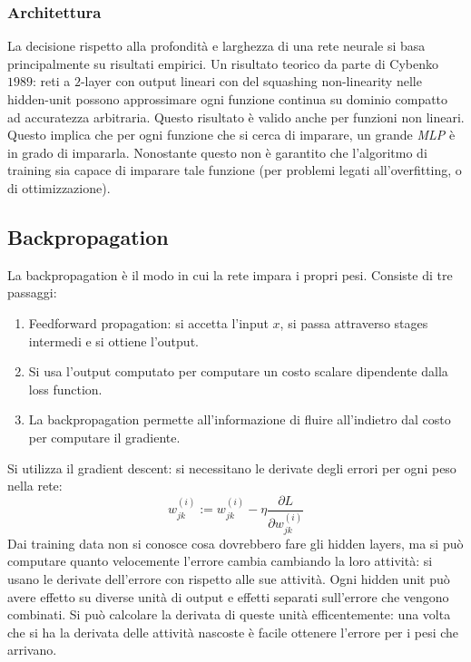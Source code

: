 		\subsubsection{Architettura}
		La decisione rispetto alla profondit\`a e larghezza di una rete neurale si basa principalmente su risultati empirici.
		Un risultato teorico da parte di Cybenko $1989$: reti a $2$-layer con output lineari con del squashing non-linearity nelle hidden-unit possono approssimare ogni funzione continua su dominio compatto ad accuratezza arbitraria.
		Questo risultato \`e valido anche per funzioni non lineari.
		Questo implica che per ogni funzione che si cerca di imparare, un grande \emph{MLP} \`e in grado di impararla.
		Nonostante questo non \`e garantito che l'algoritmo di training sia capace di imparare tale funzione (per problemi legati all'overfitting, o di ottimizzazione).

	\subsection{Backpropagation}
	La backpropagation \`e il modo in cui la rete impara i propri pesi.
	Consiste di tre passaggi:
	\begin{multicols}{2}
		\begin{enumerate}
			\item Feedforward propagation: si accetta l'input $x$, si passa attraverso stages intermedi e si ottiene l'output.
			\item Si usa l'output computato per computare un costo scalare dipendente dalla loss function.
			\item La backpropagation permette all'informazione di fluire all'indietro dal costo per computare il gradiente.
		\end{enumerate}
	\end{multicols}
	Si utilizza il gradient descent: si necessitano le derivate degli errori per ogni peso nella rete:
	$$w^{(i)}_{jk} := w^{(i)}_{jk} - \eta\frac{\partial L}{\partial w^{(i)}_{jk}}$$
	Dai training data non si conosce cosa dovrebbero fare gli hidden layers, ma si pu\`o computare quanto velocemente l'errore cambia cambiando la loro attivit\`a: si usano le derivate dell'errore con rispetto alle sue attivit\`a.
	Ogni hidden unit pu\`o avere effetto su diverse unit\`a di output e effetti separati sull'errore che vengono combinati.
	Si pu\`o calcolare la derivata di queste unit\`a efficentemente: una volta che si ha la derivata delle attivit\`a nascoste \`e facile ottenere l'errore per i pesi che arrivano.

